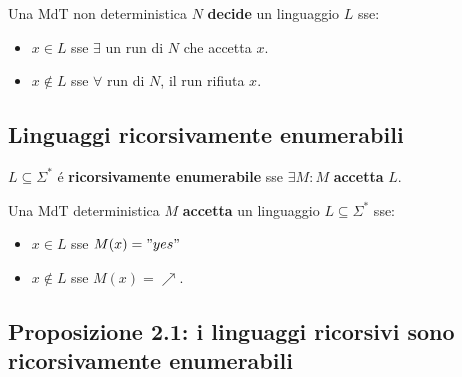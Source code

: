 Una MdT non deterministica $N$ \textbf{decide} un linguaggio $L$ sse:
\begin{itemize}
	\item $x \in L$ sse $\exists$ un run di $N$ che accetta $x$.
	\item $x \notin L$ sse $\forall$ run di $N$, il run rifiuta $x$.
\end{itemize}


\subsection{Linguaggi ricorsivamente enumerabili}
$L \subseteq \Sigma^*$ é \textbf{ricorsivamente enumerabile} sse $\exists M : M$ \textbf{accetta} $L$.

Una MdT deterministica $M$ \textbf{accetta} un linguaggio $L \subseteq \Sigma^*$ sse:
\begin{itemize}
	\item $x \in L$ sse $M(x) = "yes"$
	\item $x \notin L$ sse $M(x) = \nearrow$.
\end{itemize}


\subsection{Proposizione 2.1: i linguaggi ricorsivi sono ricorsivamente enumerabili}
\label{proposizione:linguaggi_ricorsivi_ricorsivamente_enumerabili}

